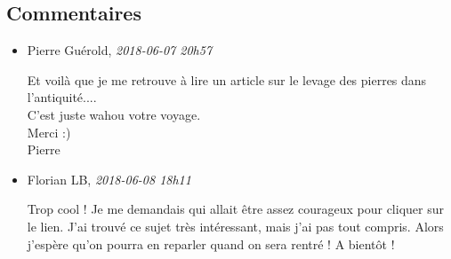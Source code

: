 \hypertarget{commentaires}{%
\subsection{Commentaires}\label{commentaires}}

\begin{itemize}
\item
  Pierre Guérold, \emph{2018-06-07 20h57}

  Et voilà que je me retrouve à lire un article sur le levage des
  pierres dans l'antiquité....\\
  C'est juste wahou votre voyage.\\
  Merci :)\\
  Pierre
\item
  Florian LB, \emph{2018-06-08 18h11}

  Trop cool ! Je me demandais qui allait être assez courageux pour
  cliquer sur le lien. J'ai trouvé ce sujet très intéressant, mais j'ai
  pas tout compris. Alors j'espère qu'on pourra en reparler quand on
  sera rentré ! A bientôt !
\end{itemize}
